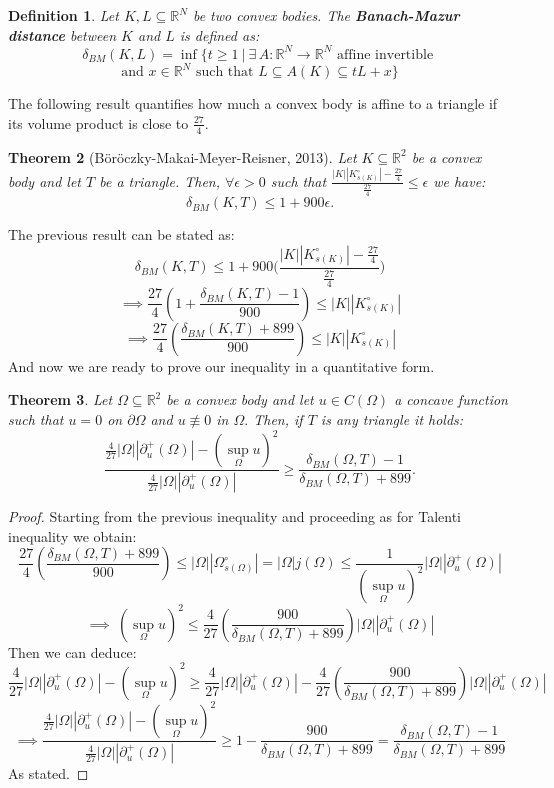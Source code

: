 \documentclass[10pt,a4paper]{amsart}
\newtheorem{theorem}{Theorem}[section]
\newtheorem{definition}[theorem]{Definition}
\numberwithin{equation}{section}
\begin{document}
\begin{definition}
    Let $K, L \subseteq \mathbb{R}^N$ be two convex bodies. The \textbf{Banach-Mazur distance} between $K$ and $L$ is defined as:
    $$
    \delta_{BM}(K,L) = \inf \{ t \geq 1 \ \Big| \ \exists \, A: \mathbb{R}^N \to \mathbb{R}^N \text{ affine invertible }
    $$
    \begin{equation}
    \text{and }  x \in \mathbb{R}^N \text{ such that } L \subseteq A(K) \subseteq t L + x \}
    \end{equation}
\end{definition}
\noindent The following result quantifies how much a convex body is affine to a triangle if its volume product is close to $\frac{27}{4}$.
\begin{theorem}[B\"or\"oczky-Makai-Meyer-Reisner, 2013]
    Let $K \subseteq \mathbb{R}^2$ be a convex body and let $T$ be a triangle.
    Then, $\forall \epsilon >0$ such that $\frac{|K||K^\circ_{s(K)}|- \frac{27}{4}}{\frac{27}{4}}\leq \epsilon$ we have:
    $$\delta_{BM}(K,T) \leq 1+900 \epsilon.$$
\end{theorem}
\noindent The previous result can be stated as:
$$\delta_{BM}(K,T) \leq 1+900\big(\frac{|K||K^\circ_{s(K)}|- \frac{27}{4}}{\frac{27}{4}}\big)$$
$$\implies \frac{27}{4}\left(1 +   \frac{\delta_{BM}(K,T)-1}{900}\right)\leq |K||K^\circ_{s(K)}| $$
\begin{equation}
    \implies \frac{27}{4}\left(\frac{\delta_{BM}(K,T)+899}{900}\right)\leq |K||K^\circ_{s(K)}|
\end{equation}
\noindent And now we are ready to prove our inequality in a quantitative form.
\begin{theorem}
    Let $\Omega \subseteq \mathbb{R}^2$ be a convex body and let $u \in C(\Omega)$ a concave function such that $u=0$ on $\partial \Omega $ and $u\not\equiv0$ in $\Omega.$  Then, if $T$ is any triangle it holds:
    $$\frac{\frac{4}{27}|\Omega||\partial^+_u(\Omega)|-(\sup_\Omega u)^2}{\frac{4}{27}|\Omega||\partial^+_u(\Omega)|}\geq \frac{\delta_{BM}(\Omega, T)-1}{\delta_{BM}(\Omega,T)+899}.$$
\end{theorem}
\begin{proof}
Starting from the previous inequality and proceeding as for Talenti inequality we obtain:
$$ \frac{27}{4}\left(\frac{\delta_{BM}(\Omega,T)+899}{900}\right) \leq |\Omega||\Omega^\circ_{s(\Omega)}|=|\Omega|j(\Omega)\leq  \frac{1}{(\sup_\Omega u)^2}|\Omega||\partial^+_u(\Omega)|$$
$$ \implies \ (\sup_\Omega u)^2\leq \frac{4}{27}\left(\frac{900}{\delta_{BM}(\Omega, T)+899}\right)|\Omega||\partial^+_u(\Omega)|$$
Then we can deduce:
$$\frac{4}{27}|\Omega||\partial^+_u(\Omega)|-(\sup_\Omega u)^2\geq \frac{4}{27}|\Omega||\partial^+_u(\Omega)|-\frac{4}{27}\left(\frac{900}{\delta_{BM}(\Omega, T)+899}\right)|\Omega||\partial^+_u(\Omega)|$$
$$\implies \frac{\frac{4}{27}|\Omega||\partial^+_u(\Omega)|-(\sup_\Omega u)^2}{\frac{4}{27}|\Omega||\partial^+_u(\Omega)|}\geq 1 - \frac{900}{\delta_{BM}(\Omega, T)+899} = \frac{\delta_{BM}(\Omega, T)-1}{\delta_{BM}(\Omega,T)+899}$$
As stated.
\end{proof}
\end{document}
